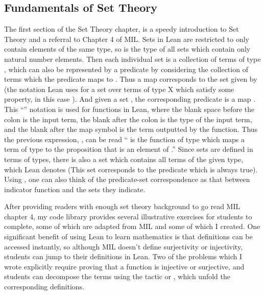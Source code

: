 \subsection{Fundamentals of Set Theory}

The first section of the Set Theory chapter,  is 
a speedy introduction to Set Theory and a referral to Chapter 4 of
MIL. Sets in Lean are restricted to only contain elements of the 
same type, so  is the type of all sets which contain
only natural number elements. Then each individual set 
is a collection of terms of type , which can also be represented
by a predicate  by considering the collection
of terms which the predicate maps to . 
Thus a map  corresponds to the set 
 given by  (the notation Lean uses for 
a set over terms of type X which satisfy some property, in this case ). 
And given a set , the corresponding
predicate is a map . 
This ``\lean{$\lambda$ \_ : \_ $\mapsto$ \_}'' notation is used for 
functions in Lean, where the blank space before the colon is the input term, the
blank after the colon is the type of the input term, and the blank after the
map symbol is the term outputted by the function. Thus the previous expression, 
, can be read 
`` is the function of type  which maps a term
 of type  to the proposition that  is an element of .''
Since sets are defined in terms of types, there is also a set which contains 
all terms of the given type, which Lean denotes  (This set
corresponds to the predicate which is always true). Using ,
one can also think of the predicate-set correspondence as
that between indicator function and the sets they indicate.

After providing readers with enough set theory background to go read 
MIL chapter 4, my code library provides several illustrative exercises for
students to complete, some of which are adapted from MIL and some of which I 
created. One significant benefit of using Lean to learn mathematics is that
definitions can be accessed instantly, so although MIL doesn't define 
surjectivity or injectivity, students can jump to their definitions in Lean.
Two of the problems which I wrote explicitly require proving that a function is
injective or surjective, and students can decompose the terms using the
tactic  or , which unfold
the corresponding definitions.

